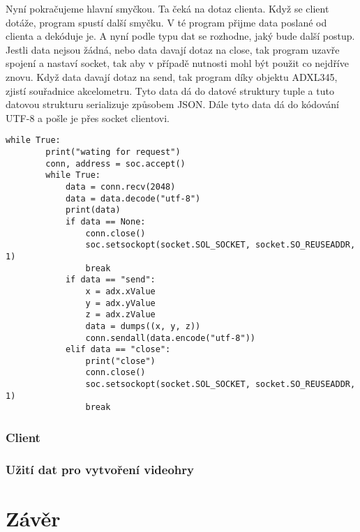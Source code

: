 \documentclass[12pt]{report}			%
\begin{document}
Nyní pokračujeme hlavní smyčkou. Ta čeká na dotaz clienta. Když se client dotáže, program spustí další smyčku. V té program přijme data poslané od clienta a dekóduje je. A nyní podle typu dat se rozhodne, jaký bude další postup. Jestli data nejsou žádná, nebo data davají dotaz na close, tak program uzavře spojení a nastaví socket, tak aby v případě nutnosti mohl být použit co nejdříve znovu. Když data davají dotaz na send, tak program díky objektu ADXL345, zjistí souřadnice akcelometru. Tyto data dá do datové struktury tuple a tuto datovou strukturu serializuje způsobem JSON. Dále tyto data dá do kódování UTF-8 a pošle je přes socket clientovi. 

\begin{lstlisting}[title={Program server.py}, caption={server.py}]
  while True:
        print("wating for request")
        conn, address = soc.accept()
        while True:
            data = conn.recv(2048)
            data = data.decode("utf-8")
            print(data)
            if data == None:
                conn.close()
                soc.setsockopt(socket.SOL_SOCKET, socket.SO_REUSEADDR, 1)
                break
            if data == "send":
                x = adx.xValue
                y = adx.yValue
                z = adx.zValue
                data = dumps((x, y, z))
                conn.sendall(data.encode("utf-8"))
            elif data == "close":
                print("close")
                conn.close()
                soc.setsockopt(socket.SOL_SOCKET, socket.SO_REUSEADDR, 1)
                break
\end{lstlisting}

\subsection{Client}

\subsection{Užití dat pro vytvoření videohry}


	\chapter*{Závěr}
	
		\lipsum[1]
	
	\nocite{*}
    	\printbibliography					
    \printglossary[title={Zkratky}]		
    \listoffigures					
    \listoftables						
\end{document}
